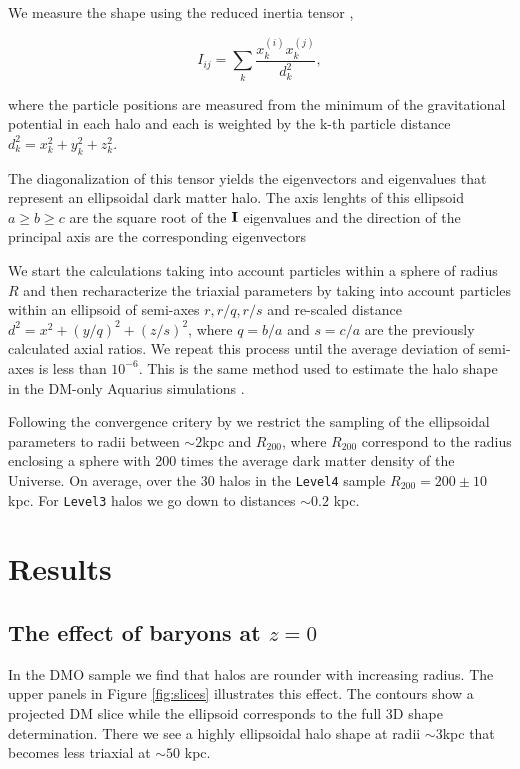 \documentclass[a4paper,fleqn,usenatbib]{mnras}
\begin{document}
We measure the shape using the reduced inertia tensor \citep{Allgood_et_al._2006}, 


\begin{equation}
I_{ij} = \sum_k \frac{x_k^{(i)}x_k^{(j)}}{d^2_k},
\label{eq:inertia}
\end{equation}

where the particle positions are measured from the minimum of the
gravitational potential in each halo and each is weighted by the k-th
particle distance 
$d_k^2=x_k^2+y_k^2+z_k^2$.

The diagonalization of this tensor yields the eigenvectors and
eigenvalues that represent an ellipsoidal dark matter halo.
The axis lenghts of this ellipsoid $a\geq b \geq c$ are the square
root of the ${\bf I}$ eigenvalues and the direction of the principal
axis are the corresponding eigenvectors 

We start the calculations taking into account particles within a
sphere of radius $R$ and then recharacterize the triaxial parameters
by taking into account particles within an ellipsoid of semi-axes
$r,r/q,r/s$ and re-scaled distance $d^2=x^2+(y/q)^2+(z/s)^2$, where $q
= b/a$ and $s=c/a$ are the previously calculated axial ratios. 
We repeat this process until the average deviation of semi-axes is
less than $10^{-6}$.  
This is the same method used to estimate the halo shape in the DM-only
Aquarius simulations \citep{Vera-Ciro_et_al._2011}. 

Following the convergence critery by \cite{Vera-Crito_et_al.2011} we
restrict the sampling of the ellipsoidal parameters to radii  between
$\sim 2$kpc and $R_{200}$, where  $R_{200}$ correspond to the  radius
enclosing a sphere with 200 times the average dark matter density of
the Universe.  
On average, over the 30 halos in the \texttt{Level4} sample
$R_{200}=200\pm 10$kpc. 
For \texttt{Level3} halos we go down to distances $\sim 0.2$ kpc.  


\section{Results}

\subsection{The effect of baryons at $z=0$}

In the DMO sample we find that halos are rounder with increasing
radius.
The upper panels in Figure \ref{fig:slices} illustrates this effect.
The contours show a projected DM slice while the ellipsoid corresponds
to the full 3D shape determination. 
There we see a highly ellipsoidal halo shape at radii $\sim 3$kpc
that becomes less triaxial at $\sim 50$ kpc.
\end{document}
